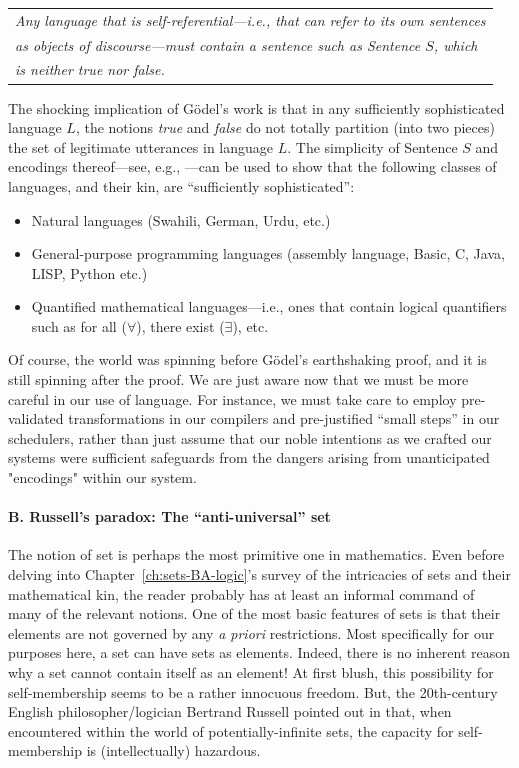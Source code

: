 \begin{tabular}{l}
{\em Any language that is self-referential---i.e., that can refer to
  its own sentences} \\
{\em as objects of discourse---must contain a sentence such as
  Sentence $S$, which} \\
{\em is neither true nor false.}  \cite{Goedel31}
\end{tabular}

The shocking implication of G\"{o}del's work is that in any
sufficiently sophisticated language $L$, the notions {\it true} and
{\it false} do not totally partition (into two pieces) the set of
legitimate utterances in language $L$.  The simplicity of Sentence $S$
and encodings thereof---see, e.g., \cite{Rosenberg09}---can be used to
show that the following classes of languages, and their kin, are
``sufficiently sophisticated'':
\begin{itemize}
\item
Natural languages (Swahili, German, Urdu, etc.)
\item
General-purpose programming languages (assembly language, Basic, C,
Java, LISP, Python etc.)
\item
Quantified mathematical languages---i.e., ones that contain logical
quantifiers such as {\sc for all} ($\forall$), {\sc there exist}
($\exists$), etc.
\end{itemize}

Of course, the world was spinning before G\"{o}del's earthshaking
proof, and it is still spinning after the proof.  We are just aware
now that we must be more careful in our use of language.  For
instance, we must take care to employ pre-validated transformations in
our compilers and pre-justified ``small steps'' in our schedulers,
rather than just assume that our noble intentions as we crafted our
systems were sufficient safeguards from the dangers arising from
unanticipated "encodings" within our system.


\paragraph{B.  Russell's paradox: The ``anti-universal'' set}

The notion of set is perhaps the most primitive one in mathematics.
Even before delving into Chapter~\ref{ch:sets-BA-logic}'s survey of
the intricacies of sets and their mathematical kin, the reader
probably has at least an informal command of many of the relevant
notions.  One of the most basic features of sets is that their
elements are not governed by any {\it a priori} restrictions.  Most
specifically for our purposes here, a set can have sets as elements.
Indeed, there is no inherent reason why a set cannot contain itself as
an element!  At first blush, this possibility for self-membership
seems to be a rather innocuous freedom.  But, the 20th-century English
philosopher/logician Bertrand Russell
pointed out in \cite{Russell02,Russell03} that, when encountered
within the world of potentially-infinite sets, the capacity for
self-membership is (intellectually) hazardous.

